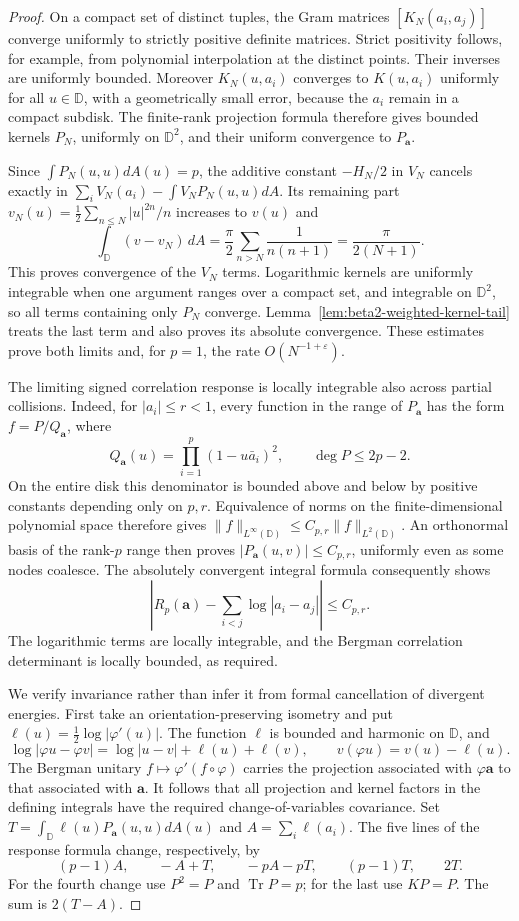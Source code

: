 \documentclass[11pt,a4paper]{article}
\numberwithin{equation}{section}
\theoremstyle{definition}
\theoremstyle{remark}
\newcommand{\D}{\mathbb D}
\begin{document}
\begin{proof}
On a compact set of distinct tuples, the Gram matrices
$[K_N(a_i,a_j)]$ converge uniformly to strictly positive definite
matrices.  Strict positivity follows, for example, from polynomial
interpolation at the distinct points.  Their inverses are uniformly
bounded.  Moreover $K_N(u,a_i)$ converges to $K(u,a_i)$ uniformly for
all $u\in\D$, with a geometrically small error, because the $a_i$
remain in a compact subdisk.  The finite-rank projection formula
therefore gives bounded kernels $P_N$, uniformly on $\D^2$, and their
uniform convergence to $P_{\mathbf a}$.

Since $\int P_N(u,u)dA(u)=p$, the additive constant $-H_N/2$ in
$V_N$ cancels exactly in
$\sum_i V_N(a_i)-\int V_NP_N(u,u)dA$.  Its remaining part
$v_N(u)=\tfrac12\sum_{n\le N}|u|^{2n}/n$ increases to $v(u)$ and
\[
 \int_\D(v-v_N)\,dA
 =\frac\pi2\sum_{n>N}\frac1{n(n+1)}=\frac\pi{2(N+1)}.
\]
This proves convergence of the $V_N$ terms.  Logarithmic kernels
are uniformly integrable when one argument ranges over a compact
set, and integrable on $\D^2$, so all terms containing only $P_N$
converge.  Lemma~\ref{lem:beta2-weighted-kernel-tail} treats the last
term and also proves its absolute convergence.  These estimates
prove both limits and, for $p=1$, the rate $O(N^{-1+\varepsilon})$.

The limiting signed correlation response is locally integrable also
across partial collisions.  Indeed, for $|a_i|\le r<1$, every function
in the range of $P_{\mathbf a}$ has the form $f=P/Q_{\mathbf a}$,
where
\[
 Q_{\mathbf a}(u)=\prod_{i=1}^p(1-u\bar a_i)^2,
 \qquad \deg P\le2p-2.
\]
On the entire disk this denominator is bounded above and below by
positive constants depending only on $p,r$.  Equivalence of norms
on the finite-dimensional polynomial space therefore gives
$\|f\|_{L^\infty(\D)}\le C_{p,r}\|f\|_{L^2(\D)}$.  An orthonormal
basis of the rank-$p$ range then proves
$|P_{\mathbf a}(u,v)|\le C_{p,r}$, uniformly even as some nodes
coalesce.  The absolutely convergent integral formula consequently
shows
\[
 \left|R_p(\mathbf a)-\sum_{i<j}\log|a_i-a_j|\right|\le C_{p,r}.
\]
The logarithmic terms are locally integrable, and the Bergman
correlation determinant is locally bounded, as required.

We verify invariance rather than infer it from formal cancellation
of divergent energies.  First take an orientation-preserving
isometry and put $\ell(u)=\tfrac12\log|\varphi'(u)|$.  The function
$\ell$ is bounded and harmonic on $\D$, and
\[
 \log|\varphi u-\varphi v|=\log|u-v|+\ell(u)+\ell(v),
 \qquad v(\varphi u)=v(u)-\ell(u).
\]
The Bergman unitary $f\mapsto\varphi'(f\circ\varphi)$ carries the
projection associated with $\varphi\mathbf a$ to that associated
with $\mathbf a$.  It follows that all projection and kernel factors
in the defining integrals have the required change-of-variables
covariance.  Set $T=\int_\D\ell(u)P_{\mathbf a}(u,u)dA(u)$ and
$A=\sum_i\ell(a_i)$.  The five lines of the response formula change,
respectively, by
\[
 (p-1)A,\qquad -A+T,\qquad -pA-pT,
 \qquad (p-1)T,\qquad 2T.
\]
For the fourth change use $P^2=P$ and $\operatorname{Tr}P=p$;
for the last use $KP=P$.  The sum is $2(T-A)$.


\end{proof}
\end{document}
